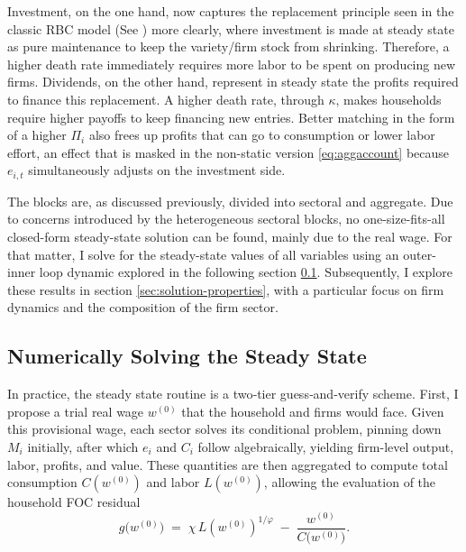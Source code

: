\documentclass[a4paper,12pt]{article} %
\numberwithin{equation}{section} %
\numberwithin{figure}{section}
\numberwithin{table}{section}
\begin{document}
Investment, on the one hand, now captures the replacement principle seen in the classic RBC model 
(See \cite{campbell1994inspecting}) more clearly, where investment is made at steady state as pure maintenance to keep the variety/firm stock from shrinking. Therefore,
a higher death rate immediately requires more labor to be spent on producing new firms. Dividends, on the other hand, represent in
steady state the profits required to finance this replacement. A higher death rate, through $\kappa$, makes households require 
higher payoffs to keep financing new entries. Better matching in the form of a higher $\Pi_i$ also frees up profits that can go to 
consumption or lower labor effort, an effect that is masked in the non-static version \eqref{eq:aggaccount} because $e_{i,t}$ 
simultaneously adjusts on the investment side.

The blocks are,
as discussed previously, divided into sectoral and aggregate. Due to concerns introduced by the heterogeneous sectoral blocks, no
one-size-fits-all closed-form steady-state solution can be found, mainly due to the real wage. For that matter, I solve for the
steady-state values of all variables using an outer-inner loop dynamic explored in the following section \ref{sec:solution-num}.
Subsequently, I explore these results in section \ref{sec:solution-properties}, with a particular focus on firm dynamics and the
composition of the firm sector.


\subsection{Numerically Solving the Steady State}
\label{sec:solution-num}

In practice, the steady state routine is a two‐tier guess‐and‐verify scheme. 
First, I propose a trial real wage \(w^{(0)}\) that the household and firms would face. 
Given this provisional wage, each sector solves its conditional problem, pinning down \(M_i\) initially, after which $e_i$
and \(C_i\) follow algebraically, yielding firm-level output, labor, profits, and value. 
These quantities are then aggregated to compute total consumption \(C(w^{(0)})\) and labor \(L(w^{(0)})\), allowing the
evaluation of the household FOC residual
\begin{equation}
g\bigl(w^{(0)}\bigr) \;=\; \chi\,L(w^{(0)})^{1/\varphi} \;-\; \frac{w^{(0)}}{C\bigl(w^{(0)}\bigr)}. \label{bisection}
\end{equation}
\end{document}
